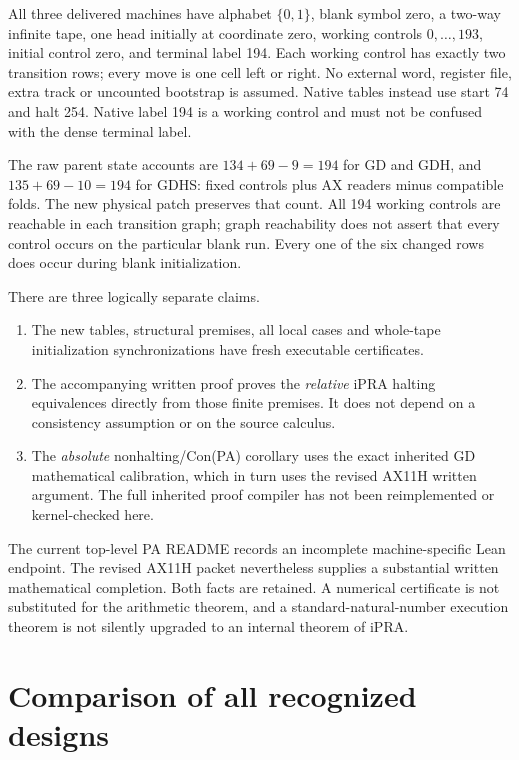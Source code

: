 \documentclass[11pt,letterpaper]{article}
\begin{document}
All three delivered machines have alphabet $\{0,1\}$, blank symbol zero,
a two-way infinite tape, one head initially at coordinate zero, working
controls $0,\ldots,193$, initial control zero, and terminal label 194.
Each working control has exactly two transition rows; every move is one
cell left or right. No external word, register file, extra track or
uncounted bootstrap is assumed. Native tables instead use start 74 and
halt 254. Native label 194 is a working control and must not be confused
with the dense terminal label.



The raw parent state accounts are $134+69-9=194$ for GD and GDH, and
$135+69-10=194$ for GDHS: fixed controls plus AX readers minus compatible
folds. The new physical patch preserves that count. All 194 working
controls are reachable in each transition graph; graph reachability
does not assert that every control occurs on the particular blank run.
Every one of the six changed rows does occur during blank initialization.

There are three logically separate claims.
\begin{enumerate}
\item The new tables, structural premises, all local cases and whole-tape
initialization synchronizations have fresh executable certificates.
\item The accompanying written proof proves the \emph{relative} iPRA
halting equivalences directly from those finite premises. It does not
depend on a consistency assumption or on the source calculus.
\item The \emph{absolute} nonhalting/Con(PA) corollary uses the exact
inherited GD mathematical calibration, which in turn uses the revised
AX11H written argument. The full inherited proof compiler has not been
reimplemented or kernel-checked here.
\end{enumerate}
The current top-level PA README records an incomplete machine-specific
Lean endpoint. The revised AX11H packet nevertheless supplies a substantial
written mathematical completion. Both facts are retained. A numerical
certificate is not substituted for the arithmetic theorem, and a
standard-natural-number execution theorem is not silently upgraded to
an internal theorem of iPRA.\cite{pa,ax11h,gd}

\section{Comparison of all recognized designs}
\label{sec:comparison}
\end{document}
